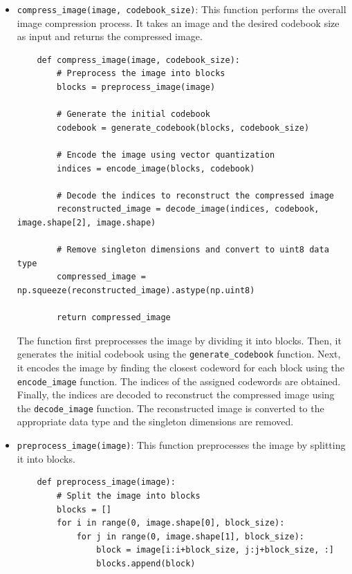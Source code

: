 \documentclass{article}
\begin{document}
\begin{itemize}
    \item \texttt{compress\_image(image, codebook\_size)}: This function performs the overall image compression process. It takes an image and the desired codebook size as input and returns the compressed image.

    \begin{code}
    \begin{verbatim}
    def compress_image(image, codebook_size):
        # Preprocess the image into blocks
        blocks = preprocess_image(image)

        # Generate the initial codebook
        codebook = generate_codebook(blocks, codebook_size)

        # Encode the image using vector quantization
        indices = encode_image(blocks, codebook)

        # Decode the indices to reconstruct the compressed image
        reconstructed_image = decode_image(indices, codebook, image.shape[2], image.shape)

        # Remove singleton dimensions and convert to uint8 data type
        compressed_image = np.squeeze(reconstructed_image).astype(np.uint8)

        return compressed_image
    \end{verbatim}
    \end{code}

    The function first preprocesses the image by dividing it into blocks. Then, it generates the initial codebook using the \texttt{generate\_codebook} function. Next, it encodes the image by finding the closest codeword for each block using the \texttt{encode\_image} function. The indices of the assigned codewords are obtained. Finally, the indices are decoded to reconstruct the compressed image using the \texttt{decode\_image} function. The reconstructed image is converted to the appropriate data type and the singleton dimensions are removed.

    \item \texttt{preprocess\_image(image)}: This function preprocesses the image by splitting it into blocks.

    \begin{code}
    \begin{verbatim}
    def preprocess_image(image):
        # Split the image into blocks
        blocks = []
        for i in range(0, image.shape[0], block_size):
            for j in range(0, image.shape[1], block_size):
                block = image[i:i+block_size, j:j+block_size, :]
                blocks.append(block)


\end{verbatim}
\end{code}
\end{itemize}
\end{document}

